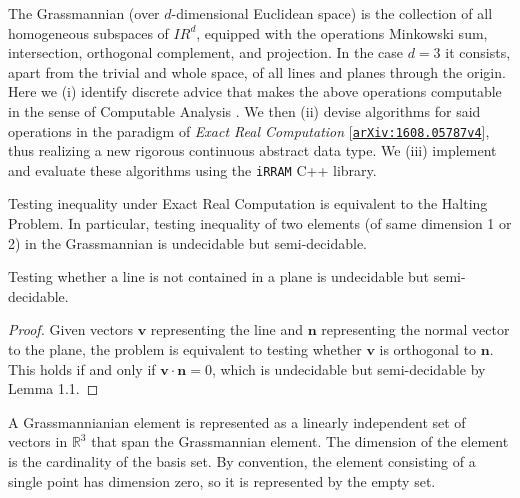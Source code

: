 \documentclass[12pt]{article}
\newcommand{\R}{\mathbb{R}}
\newcommand{\arXiv}[1]{\href{http://arXiv.org/abs/#1}{\textup{\texttt{arXiv:#1}}}\xspace}
\newenvironment{definition}[2][Definition]{\begin{trivlist}
\item[\hskip \labelsep {\bfseries #1}\hskip \labelsep {\bfseries #2.}]}{\end{trivlist}}
\newenvironment{corollary}[2][Corollary]{\begin{trivlist}
\item[\hskip \labelsep {\bfseries #1}\hskip \labelsep {\bfseries #2.}]}{\end{trivlist}}
\newenvironment{lemma}[2][Lemma]{\begin{trivlist}
\item[\hskip \labelsep {\bfseries #1}\hskip \labelsep {\bfseries #2.}]}{\end{trivlist}}
\begin{document}
 
 
\title{}
\author{Seokbin Lee, 20160464}
\maketitle

The Grassmannian (over $d$-dimensional Euclidean space) is the collection of all homogeneous subspaces of $IR^d$,
equipped with the operations Minkowski sum, intersection, orthogonal complement, and projection.
In the case $d=3$ it consists, apart from the trivial and whole space, of all lines and planes through the origin.
Here we (i) identify discrete advice \cite{Zie12} that makes the above operations computable in the sense of Computable Analysis \cite{Wei00}. We then (ii) devise algorithms for said operations in the paradigm of \emph{Exact Real Computation} [\arXiv{1608.05787v4}], thus realizing a new rigorous continuous abstract data type.
We (iii) implement and evaluate these algorithms using the \texttt{iRRAM} C++ library.

\begin{lemma}{1.1}
Testing inequality under Exact Real Computation is equivalent to the Halting Problem. In particular, testing inequality of two elements (of same dimension 1 or 2) in the Grassmannian is undecidable but semi-decidable.
\end{lemma}

\begin{corollary}{1.2}
Testing whether a line is not contained in a plane is undecidable but semi-decidable.
\end{corollary}

\begin{proof}
Given vectors \(\mathbf{v}\) representing the line and \(\mathbf{n}\) representing the normal vector to the plane, the problem is equivalent to testing whether \(\mathbf{v}\) is orthogonal to \(\mathbf{n}\). This holds if and only if \(\mathbf{v} \cdot \mathbf{n} = 0\), which is undecidable but semi-decidable by Lemma 1.1.
\end{proof}

\begin{definition}{1.3}
A Grassmannianian element is represented as a linearly independent set of vectors in \(\R^3\) that span the Grassmannian element. The dimension of the element is the cardinality of the basis set. By convention, the element consisting of a single point has dimension zero, so it is represented by the empty set.
\end{definition}
\end{document}
